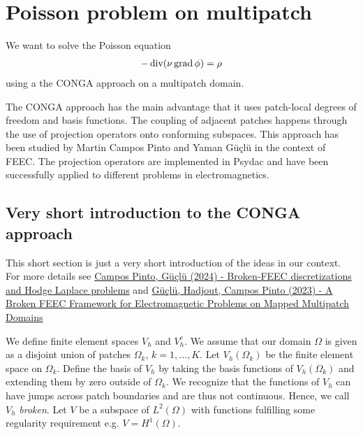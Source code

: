 \documentclass[presentation.tex]{subfiles}
\begin{document}
\section{Poisson problem on multipatch}
We want to solve the Poisson equation
\begin{align*}
    -\operatorname{div} (\nu \operatorname{grad} \phi) = \rho
\end{align*}
using a the CONGA approach on a multipatch domain. 

The CONGA approach has the main advantage that it uses patch-local 
degrees of freedom and basis functions. The coupling of adjacent patches 
happens through the use of projection operators onto conforming subspaces. 
This approach has been studied by Martin Campos Pinto and Yaman Güçlü in the context of FEEC. 
The projection operators are implemented in Psydac and 
have been successfully applied to different problems in electromagnetics. 


\subsection*{Very short introduction to the CONGA approach}
This short section is just a very short
introduction of the ideas in our context. 
For more details see \href{https://arxiv.org/abs/2109.02553}{Campos Pinto, Güçlü (2024) - Broken-FEEC discretizations and Hodge Laplace 
problems} and \href{https://link.springer.com/article/10.1007/s10915-023-02351-x}{Güçlü, 
            Hadjout, Campos Pinto (2023) - A Broken FEEC Framework for Electromagnetic Problems on Mapped Multipatch Domains}


We define finite element spaces $V_h$ and $V_h^c$. 
We assume that our domain $\Omega$ is given as a disjoint union of patches 
$\Omega_k$, $k=1, ..., K$.
Let $V_h(\Omega_k)$ be the finite element space on $\Omega_k$. 
Define the basis of $V_h$ by taking the basis functions of $V_h(\Omega_k)$ and 
extending them by zero outside of $\Omega_k$. 
We recognize that the functions of $V_h$ can have jumps across 
patch boundaries and are thus not continuous. 
Hence, we call $V_h$ \textit{broken}.
Let $V$ be a subspace of $L^2(\Omega)$ with functions fulfilling some regularity
requirement e.g. $V=H^1(\Omega)$.
\end{document}
